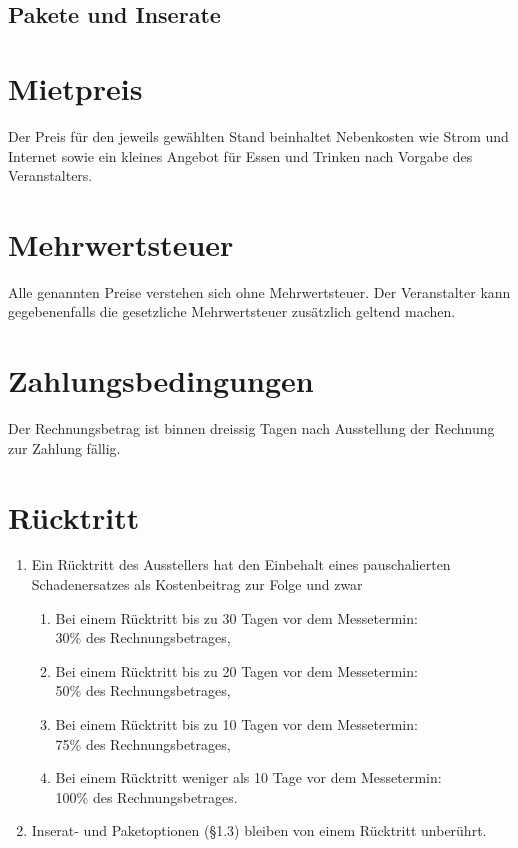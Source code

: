 \companydatechoice

\subsection{Pakete und Inserate}

\companyextrachoice

\section{Mietpreis}

Der Preis für den jeweils gewählten Stand beinhaltet Nebenkosten wie Strom und Internet sowie ein kleines Angebot für Essen und Trinken nach Vorgabe des Veranstalters.

\section{Mehrwertsteuer}

Alle genannten Preise verstehen sich ohne Mehrwertsteuer. Der Veranstalter kann gegebenenfalls die gesetzliche Mehrwertsteuer zusätzlich geltend machen.

\section{Zahlungsbedingungen}

Der Rechnungsbetrag ist binnen dreissig Tagen nach Ausstellung der Rechnung zur Zahlung fällig.

\section{Rücktritt}
\begin{enumerate}
	\item Ein Rücktritt des Ausstellers hat den Einbehalt eines pauschalierten
		Schadenersatzes als Kostenbeitrag zur Folge und zwar
	\begin{enumerate}
		\item Bei einem Rücktritt bis zu 30 Tagen vor dem Messetermin:\\
			30\% des Rechnungsbetrages,
		\item Bei einem Rücktritt bis zu 20 Tagen vor dem Messetermin:\\
			50\% des Rechnungsbetrages,
		\item Bei einem Rücktritt bis zu 10 Tagen vor dem Messetermin:\\
			75\% des Rechnungsbetrages,
		\item Bei einem Rücktritt weniger als 10 Tage vor dem Messetermin:\\
			100\% des Rechnungsbetrages.
	\end{enumerate}

	\item Inserat- und Paketoptionen (\S 1.3) bleiben von einem Rücktritt unberührt.
\end{enumerate}

